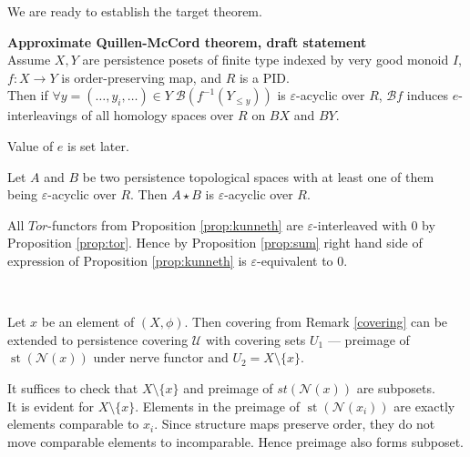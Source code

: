 We are ready to establish the target theorem.\\

\begin{theorem} \textbf{Approximate Quillen-McCord theorem, draft statement}\\
  Assume $X, Y$ are persistence posets of finite type indexed by very good monoid $I$, $f : X \to Y$ is order-preserving map, and $R$ is a PID.\\

  Then if $\forall y=(\ldots,y_i,\ldots) \in Y\;\mathcal{B}(f^{-1}(Y_{\leqslant y}))$ is $\varepsilon$-acyclic over $R$, $\mathcal{B}f$ induces $e$-interleavings of all homology spaces over $R$ on $BX$ and $BY$.\\
\end{theorem}

Value of $e$ is set later.\\

\begin{proposition}
  \label{prop:acyclic}
  Let $A$ and $B$ be two persistence topological spaces with at least one of them being $\varepsilon$-acyclic over $R$. Then $A \star B$ is $\varepsilon$-acyclic over $R$.
\end{proposition}

\begin{pf}
  All $Tor$-functors from Proposition \ref{prop:kunneth} are $\varepsilon$-interleaved with $0$ by Proposition \ref{prop:tor}. Hence by Proposition \ref{prop:sum} right hand side of expression of Proposition \ref{prop:kunneth} is $\varepsilon$-equivalent to $0$.\\
\end{pf}\\

\begin{proposition}
  Let $x$ be an element of $(X,\phi)$. Then covering from Remark \ref{covering} can be extended to persistence covering $\mathcal{U}$ with covering sets $U_1$ --- preimage of $\operatorname{st}(\mathcal{N}(x))$ under nerve functor and $U_2 = X \setminus \{x\}$.
\end{proposition}

\begin{pf}
  It suffices to check that $X \setminus \{x\}$ and preimage of $st(\mathcal{N}(x))$ are subposets.\\

  It is evident for $X \setminus \{x\}$. Elements in the preimage of $\operatorname{st}(\mathcal{N}(x_i))$ are exactly elements comparable to $x_i$. Since structure maps preserve order, they do not move comparable elements to incomparable. Hence preimage also forms subposet.
\end{pf}\\

